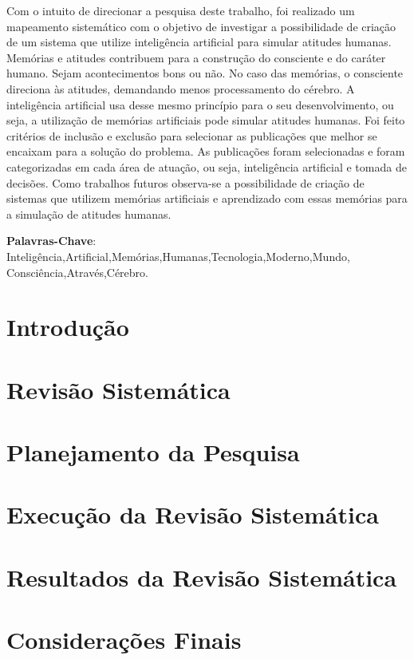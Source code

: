 Com o intuito de direcionar a pesquisa deste trabalho, foi realizado um mapeamento sistemático com o objetivo de investigar a possibilidade de criação de um sistema que utilize inteligência artificial para simular atitudes humanas. Memórias e atitudes contribuem para a construção do consciente e do caráter humano. Sejam acontecimentos bons ou não. No caso das memórias, o consciente direciona às atitudes, demandando menos processamento do cérebro. A inteligência artificial usa desse mesmo princípio para o seu desenvolvimento, ou seja, a utilização de memórias artificiais pode simular atitudes humanas. Foi feito critérios de inclusão e exclusão para selecionar as publicações que melhor se encaixam para a solução do problema. As publicações foram selecionadas e foram categorizadas em cada área de atuação, ou seja, inteligência artificial e tomada de decisões. Como trabalhos futuros observa-se a possibilidade de criação de sistemas que utilizem memórias artificiais e aprendizado com essas memórias para a simulação de atitudes humanas.

\noindent
 
\textbf{Palavras-Chave}: Inteligência,Artificial,Memórias,Humanas,Tecnologia,Moderno,Mundo,
\\Consciência,Através,Cérebro.

\vspace{2cm}

\section{Introdução}
\label{introducao}


\section{Revisão Sistemática}
\label{sec:revisaosistematica}


\vspace{1cm}
\section{Planejamento da Pesquisa}
\label{sec:planejamento}


\vspace{1cm}
\section{Execução da Revisão Sistemática}
\label{sec:execucao}


\vspace{1cm}
\section{Resultados da Revisão Sistemática}
\label{sec:resultados}


\vspace{1cm}
\section{Considerações Finais}
\label{sec:consideracoes}
